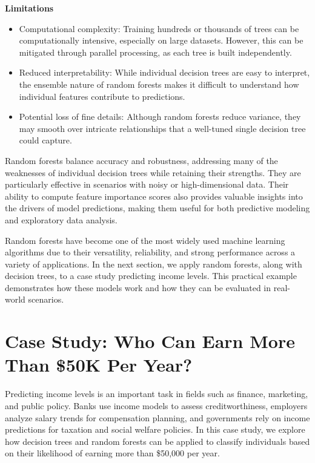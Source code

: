 \documentclass[
  11pt,
]{book}
\providecommand{\tightlist}{%
  \setlength{\itemsep}{0pt}\setlength{\parskip}{0pt}}
\theoremstyle{definition}
\theoremstyle{definition}
\theoremstyle{definition}
\theoremstyle{definition}
\theoremstyle{remark}
\begin{document}
\textbf{Limitations}

\begin{itemize}
\tightlist
\item
  Computational complexity: Training hundreds or thousands of trees can be computationally intensive, especially on large datasets. However, this can be mitigated through parallel processing, as each tree is built independently.\\
\item
  Reduced interpretability: While individual decision trees are easy to interpret, the ensemble nature of random forests makes it difficult to understand how individual features contribute to predictions.\\
\item
  Potential loss of fine details: Although random forests reduce variance, they may smooth over intricate relationships that a well-tuned single decision tree could capture.
\end{itemize}

Random forests balance accuracy and robustness, addressing many of the weaknesses of individual decision trees while retaining their strengths. They are particularly effective in scenarios with noisy or high-dimensional data. Their ability to compute feature importance scores also provides valuable insights into the drivers of model predictions, making them useful for both predictive modeling and exploratory data analysis.

Random forests have become one of the most widely used machine learning algorithms due to their versatility, reliability, and strong performance across a variety of applications. In the next section, we apply random forests, along with decision trees, to a case study predicting income levels. This practical example demonstrates how these models work and how they can be evaluated in real-world scenarios.

\section{Case Study: Who Can Earn More Than \$50K Per Year?}\label{tree-case-study}

Predicting income levels is an important task in fields such as finance, marketing, and public policy. Banks use income models to assess creditworthiness, employers analyze salary trends for compensation planning, and governments rely on income predictions for taxation and social welfare policies. In this case study, we explore how decision trees and random forests can be applied to classify individuals based on their likelihood of earning more than \$50,000 per year.
\end{document}

